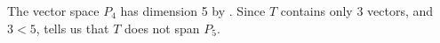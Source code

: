 The vector space $P_4$ has dimension 5 by .  Since $T$ contains only 3 vectors, and $3<5$,  tells us that $T$ does not span $P_5$.
